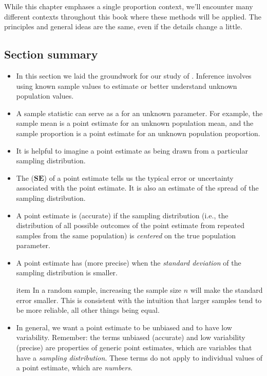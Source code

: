 While this chapter emphases a single proportion
context, we'll encounter many different contexts
throughout this book where these methods will be
applied.
The principles and general ideas are the same,
even if the details change a little.



\D{\newpage}

\subsection*{Section summary}
\begin{itemize}
\item In this section we laid the groundwork for our study of .  Inference involves using known sample values to estimate or better understand unknown population values.

\item  A sample statistic can serve as a  for an unknown parameter.  For example, the sample mean is a point estimate for an unknown population mean, and the sample proportion is a point estimate for an unknown population proportion.

\item It is helpful to imagine a point estimate as being drawn from a particular sampling distribution.  

\item The  ($\textbf{SE}$) of a point estimate tells us the typical error or uncertainty associated with the point estimate.  It is also an estimate of the spread of the sampling distribution.  

\item A point estimate is  (accurate) if the sampling distribution (i.e., the distribution of all possible outcomes of the point estimate from repeated samples from the same population) is \textit{centered} on the true population parameter.  

\item A point estimate has  (more precise) when the \textit{standard deviation} of the sampling distribution is smaller. 

item In a random sample, increasing the sample size $n$ will make the standard error smaller.  This is consistent with the intuition that larger samples tend to be more reliable, all other things being equal.

\item In general, we want a point estimate to be unbiased and to have low variability.  Remember:  the terms unbiased (accurate) and low variability (precise) are properties of generic point estimates, which are variables that have a \emph{sampling distribution}.  These terms do not apply to individual values of a point estimate, which are \textit{numbers}.  

\end{itemize}


